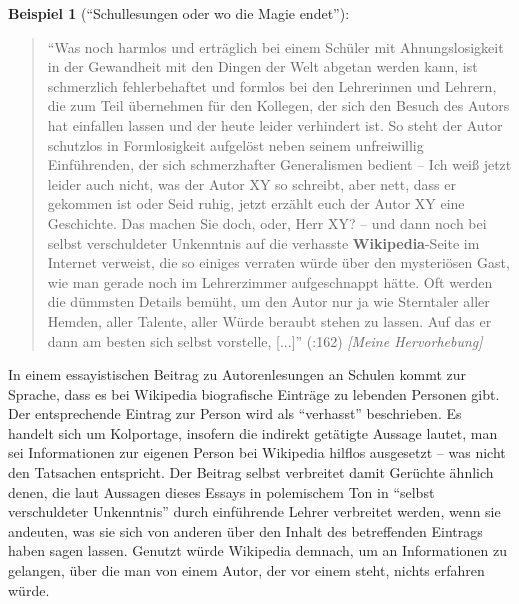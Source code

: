\documentclass[fontsize=12pt]{scrartcl}
\begin{document}
\textbf{Beispiel 1} ("`Schullesungen oder wo die Magie endet"'):
\singlespacing
\begin{quote}
"`Was noch harmlos und ertr\"aglich bei einem Sch\"uler mit Ahnungslosigkeit in der Gewandheit mit den Dingen der Welt abgetan werden kann, ist schmerzlich fehlerbehaftet und formlos bei den Lehrerinnen und Lehrern, die zum Teil \"ubernehmen f\"ur den Kollegen, der sich den Besuch des Autors hat einfallen lassen und der \flq heute leider verhindert\frq \,\,ist. So steht der Autor schutzlos in Formlosigkeit aufgel\"ost neben seinem unfreiwillig Einf\"uhrenden, der sich schmerzhafter Generalismen bedient -- \flq Ich wei{\ss} jetzt leider auch nicht, was der Autor XY so schreibt, aber nett, dass er gekommen ist\frq \,\,oder \flq Seid ruhig, jetzt erz\"ahlt euch der Autor XY eine Geschichte. Das machen Sie doch, oder, Herr XY?\frq \,\,-- und dann noch bei \mbox{selbst} verschuldeter Unkenntnis auf die verhasste \textbf{Wi\-ki\-pe\-dia}-Seite im Internet verweist, die \flq so einiges\frq \,\,verraten w\"urde \"uber den mysteri\"osen Gast, wie man gerade noch im Lehrerzimmer aufgeschnappt h\"atte. Oft werden die d\"ummsten Details bem\"uht, um den Autor nur ja wie Sterntaler aller Hemden, aller Talente, aller W\"urde beraubt stehen zu lassen. Auf das er dann \flq am besten sich \mbox{selbst}\frq \,\,vorstelle, [...]"' (\cite{Gomringer2013}:162) \textit{[Meine Hervorhebung]}
\end{quote}
\onehalfspacing

In einem essayistischen Beitrag zu Autoren\textsuperscript{\tiny *}lesungen an Schulen kommt zur Sprache, dass es bei Wi\-ki\-pe\-dia biografische Eintr\"age zu lebenden Per\-so\-nen gibt. Der ent\-spre\-chen\-de Eintrag zur Person wird als "`verhasst"' beschrieben. Es handelt sich um Kolportage, insofern die indirekt get\"atigte Aussage lautet, man sei Informationen zur eigenen Person bei Wi\-ki\-pe\-dia hilflos ausgesetzt -- was nicht den Tatsachen entspricht. Der Beitrag \mbox{selbst} verbreitet damit Ger\"uchte \"ahnlich denen, die laut Aussagen dieses Essays in polemischem Ton in "`\mbox{selbst} verschuldeter Unkenntnis"' durch einf\"uhrende Lehrer\textsuperscript{\tiny *} verbreitet werden, wenn sie andeuten, was sie sich von anderen \"uber den Inhalt des betreffenden Eintrags haben sagen lassen. Genutzt w\"urde Wi\-ki\-pe\-dia demnach, um an Informationen zu gelangen, \"uber die man von einem Autor, der vor einem steht, nichts erfahren w\"urde.
\end{document}
